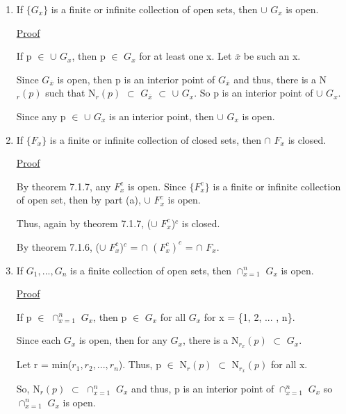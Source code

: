 	\begin{enumerate}[label=(\alph*), leftmargin=2cm, itemsep=0.4em]
		\item If $\{G_x\}$ is a finite or infinite collection of open sets,
		then $\cup$ $G_x$ is open.

			{ \color{magenta} \underline{Proof} }

				If p $\in$ $\cup$ $G_x$, then p $\in$ $G_x$ for at least one x.
				Let $\overline{x}$ be such an x.

				Since $G_{\overline{x}}$ is open, then p is an interior point of
				$G_{\overline{x}}$ and thus, there is a N$_r(p)$ such that
				N$_r(p)$ $\subset$ $G_{\overline{x}}$ $\subset$ $\cup$ $G_x$.
				So p is an interior point of $\cup$ $G_x$.

				Since any p $\in$ $\cup$ $G_x$ is an interior point, then
				$\cup$ $G_x$ is open.

		\item If $\{F_x\}$ is a finite or infinite collection of closed sets,
		then $\cap$ $F_x$ is closed.

			{ \color{magenta} \underline{Proof} }

				By {\color{red} theorem 7.1.7}, any $F_x^c$ is open.
				Since $\{F_x^c\}$ is a finite or infinite collection of
				open set, then by part (a), $\cup$ $F_x^c$ is open.

				Thus, again by {\color{red} theorem 7.1.7},
				($\cup$ $F_x^c$)$^c$ is closed.

				By {\color{red} theorem 7.1.6},
				($\cup$ $F_x^c$)$^c$ = $\cap$ $(F_x^c)^c$
				= $\cap$ $F_x$.
				
		\item If $G_1, ... , G_n$ is a finite collection of open sets,
		then $\cap_{x=1}^n$ $G_x$ is open.

			{ \color{magenta} \underline{Proof} }

				If p $\in$ $\cap_{x=1}^n$ $G_x$, then p $\in$ $G_x$ for
				all $G_x$ for x = \{1, 2, ... , n\}.

				Since each $G_x$ is open, then for any $G_x$, there is a
				N$_{r_x}(p)$ $\subset$ $G_x$.

				Let r = min($r_1, r_2 , ... , r_n$).
				Thus, p $\in$ N$_r(p)$ $\subset$ N$_{r_x}(p)$ for all x.

				So, N$_r(p)$ $\subset$ $\cap_{x=1}^n$ $G_x$ and thus,
				p is an interior point of $\cap_{x=1}^n$ $G_x$ so
			    $\cap_{x=1}^n$ $G_x$ is open.

				\vspace{0.1cm}


\end{enumerate}
